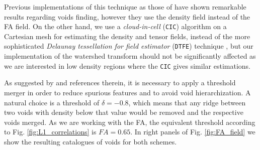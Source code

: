 \documentclass[a4,useAMS,usenatbib,usegraphicx]{latex/mn2e}
\begin{document}
Previous implementations of this technique as those of \citet{Platen07,
Neyrinck08} have shown remarkable results regarding voids finding, however
they use the density field instead of the FA field. On the other hand, we 
use a \textit{cloud-in-cell} (\texttt{CIC}) algorithm on a Cartesian mesh for 
estimating the density and tensor fields, instead of the more sophisticated 
\textit{Delaunay tessellation for field estimator} (\texttt{DTFE}) technique 
\citep{Schaap00}, but our implementation of the watershed transform should 
not be significantly affected as we are interested in low density regions 
where the \texttt{CIC} gives similar estimations.


As suggested by \citet{Platen07} and references therein, it is necessary to
apply a threshold merger in order to reduce spurious features and to avoid 
void hierarchization. A natural choice is a threshold of $\delta = -0.8$, 
which means that any ridge between two voids with density below that value
would be removed and the respective voids merged. As we are working with the
FA, the equivalent threshold according to Fig. \ref{fig:L1_correlations} is
$FA = 0.65$. In right panels of Fig. \ref{fig:FA_field} we show the resulting
catalogues of voids for both schemes.


 

\end{document}
